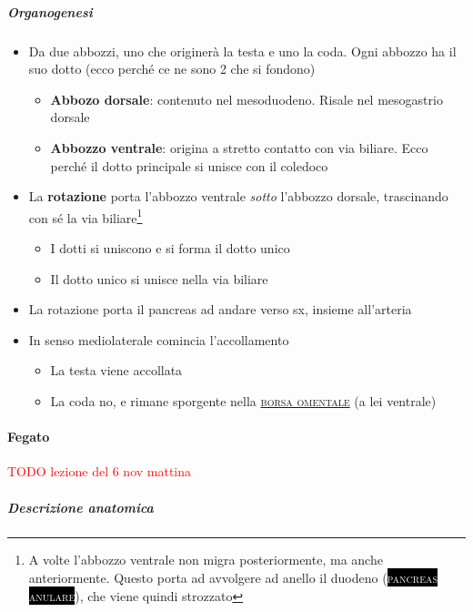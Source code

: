 \documentclass[italian,]{article}
\providecommand{\tightlist}{%
  \setlength{\itemsep}{0pt}\setlength{\parskip}{0pt}}
\newcommand{\pat}[1]{\colorbox{black}{\textcolor{white}{\textsc{#1}}}}
\renewcommand{\a}[1]{\underline{\textsc{#1}}}
\newcommand{\TODO}[1]{\textcolor{red}{\textsf{\footnotesize{TODO #1}}}} %
\begin{document}
\hypertarget{organogenesi}{%
\subparagraph{Organogenesi}\label{organogenesi}}

\begin{itemize}
\tightlist
\item
  Da due abbozzi, uno che originerà la testa e uno la coda. Ogni abbozzo
  ha il suo dotto (ecco perché ce ne sono 2 che si fondono)

  \begin{itemize}
  \tightlist
  \item
    \textbf{Abbozo dorsale}: contenuto nel mesoduodeno. Risale nel
    mesogastrio dorsale
  \item
    \textbf{Abbozzo ventrale}: origina a stretto contatto con via
    biliare. Ecco perché il dotto principale si unisce con il coledoco
  \end{itemize}
\item
  La \textbf{rotazione} porta l'abbozzo ventrale \emph{sotto} l'abbozzo
  dorsale, trascinando con sé la via biliare\footnote{A volte l'abbozzo
    ventrale non migra posteriormente, ma anche anteriormente. Questo
    porta ad avvolgere ad anello il duodeno (\pat{pancreas anulare}),
    che viene quindi strozzato}

  \begin{itemize}
  \tightlist
  \item
    I dotti si uniscono e si forma il dotto unico
  \item
    Il dotto unico si unisce nella via biliare
  \end{itemize}
\item
  La rotazione porta il pancreas ad andare verso sx, insieme all'arteria
\item
  In senso mediolaterale comincia l'accollamento

  \begin{itemize}
  \tightlist
  \item
    La testa viene accollata
  \item
    La coda no, e rimane sporgente nella \a{borsa omentale} (a lei
    ventrale)
  \end{itemize}
\end{itemize}

\hypertarget{fegato}{%
\paragraph{Fegato}\label{fegato}}

\TODO{lezione del 6 nov mattina}

\hypertarget{descrizione-anatomica}{%
\subparagraph{Descrizione anatomica}\label{descrizione-anatomica}}
\end{document}
